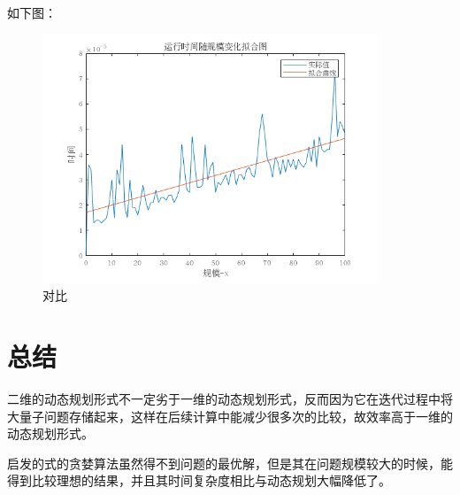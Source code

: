 \documentclass[UTF8]{ctexart}
\begin{document}
如下图：
\begin{figure}[H] %
    \centering
    \begin{minipage}[t]{1\textwidth}
        \centering
        \includegraphics[width=10cm]{10.png}
        \caption{对比}
    \end{minipage}
\end{figure}


\section{总结}
二维的动态规划形式不一定劣于一维的动态规划形式，反而因为它在迭代过程中将大量子问题存储起来，这样在后续计算中能减少很多次的比较，故效率高于一维的动态规划形式。

启发的式的贪婪算法虽然得不到问题的最优解，但是其在问题规模较大的时候，能得到比较理想的结果，并且其时间复杂度相比与动态规划大幅降低了。
\end{document}
